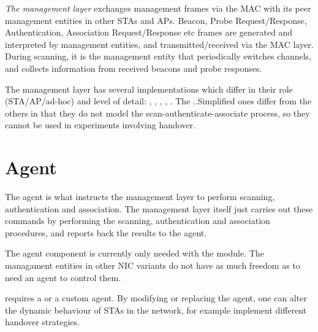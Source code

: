 \textit{The management layer} exchanges management frames via the MAC with its peer
management entities in other STAs and APs. Beacon, Probe Request/Response,
Authentication, Association Request/Response etc frames are generated
and interpreted by management entities, and transmitted/received via
the MAC layer. During scanning, it is the management entity that periodically
switches channels, and collects information from received beacons and
probe responses.

The management layer has several implementations which differ in their role
(STA/AP/ad-hoc) and level of detail: ,
, , ,
. The ..Simplified ones differ from the others
in that they do not model the scan-authenticate-associate process,
so they cannot be used in experiments involving handover.

\section{Agent}
\label{sec:80211:agent}

The agent is what instructs the management layer to perform
scanning, authentication and association. The management layer itself
just carries out these commands by performing the scanning, authentication
and association procedures, and reports back the results to the agent.

The agent component is currently only needed with the 
module. The managament entities in other NIC variants do not have as much
freedom as to need an agent to control them.

 requires a  or a custom agent.
By modifying or replacing the agent, one can alter the dynamic behaviour
of STAs in the network, for example implement different handover strategies.



